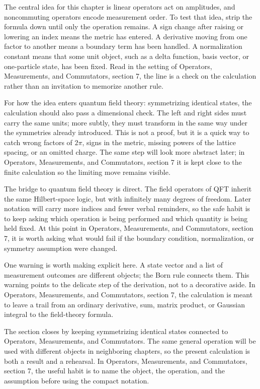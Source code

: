 The central idea for this chapter is linear operators act on amplitudes, and noncommuting operators encode measurement order.  To test that idea, strip the formula down until only the operation remains.  A sign change after raising or lowering an index means the metric has entered.  A derivative moving from one factor to another means a boundary term has been handled.  A normalization constant means that some unit object, such as a delta function, basis vector, or one-particle state, has been fixed.  Read in the setting of Operators, Measurements, and Commutators, section 7, the line is a check on the calculation rather than an invitation to memorize another rule.

For how the idea enters quantum field theory: symmetrizing identical states, the calculation should also pass a dimensional check.  The left and right sides must carry the same units; more subtly, they must transform in the same way under the symmetries already introduced.  This is not a proof, but it is a quick way to catch wrong factors of \(2\pi\), signs in the metric, missing powers of the lattice spacing, or an omitted charge.  The same step will look more abstract later; in Operators, Measurements, and Commutators, section 7 it is kept close to the finite calculation so the limiting move remains visible.

The bridge to quantum field theory is direct.  The field operators of QFT inherit the same Hilbert-space logic, but with infinitely many degrees of freedom.  Later notation will carry more indices and fewer verbal reminders, so the safe habit is to keep asking which operation is being performed and which quantity is being held fixed.  At this point in Operators, Measurements, and Commutators, section 7, it is worth asking what would fail if the boundary condition, normalization, or symmetry assumption were changed.

One warning is worth making explicit here.  A state vector and a list of measurement outcomes are different objects; the Born rule connects them.  This warning points to the delicate step of the derivation, not to a decorative aside.  In Operators, Measurements, and Commutators, section 7, the calculation is meant to leave a trail from an ordinary derivative, sum, matrix product, or Gaussian integral to the field-theory formula.

The section closes by keeping symmetrizing identical states connected to Operators, Measurements, and Commutators.  The same general operation will be used with different objects in neighboring chapters, so the present calculation is both a result and a rehearsal.  In Operators, Measurements, and Commutators, section 7, the useful habit is to name the object, the operation, and the assumption before using the compact notation.



